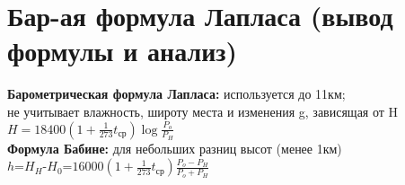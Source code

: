 
\section{Бар-ая формула Лапласа (вывод формулы и анализ)}
\textbf{Барометрическая формула Лапласа:}  используется до 11км;\\
не учитывает влажность, широту места и изменения g, зависящая от H\\
$ H=18400(1+\frac{1}{273} t_\text {ср})\log \frac{P_{o}}{P_{H}}$\\

\textbf{Формула Бабине:} для небольших разниц высот (менее 1км)\\
$h$=$H_{H}$-$H_{0}$=$16000(1+\frac{1}{273} t_\text {ср})\frac{P_{o}-P_{H}}{P_{o}+P_{H}}$